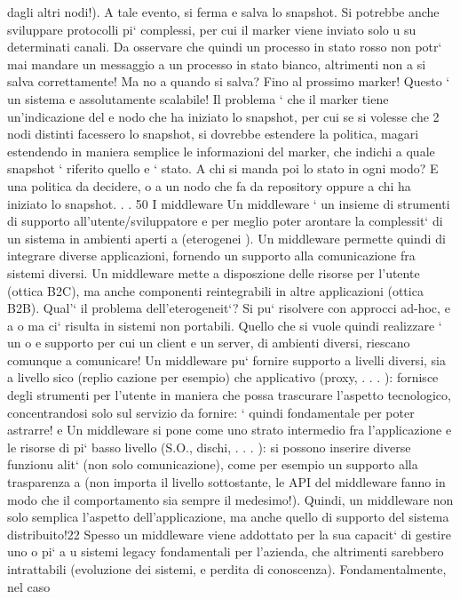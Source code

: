 \documentclass[a4paper,12pt]{article}
\begin{document}
dagli altri nodi!). A tale evento, si ferma e salva lo snapshot. Si potrebbe
anche sviluppare protocolli pi` complessi, per cui il marker viene inviato solo
u
su determinati canali. Da osservare che quindi un processo in stato rosso non
potr` mai mandare un messaggio a un processo in stato bianco, altrimenti non
a
si salva correttamente!
Ma no a quando si salva? Fino al prossimo marker! Questo ` un sistema
e
assolutamente scalabile! Il problema ` che il marker tiene un'indicazione del
e
nodo che ha iniziato lo snapshot, per cui se si volesse che 2 nodi distinti facessero
lo snapshot, si dovrebbe estendere la politica, magari estendendo in maniera
semplice le informazioni del marker, che indichi a quale snapshot ` riferito quello
e
`
stato. A chi si manda poi lo stato in ogni modo? E una politica da decidere, o
a un nodo che fa da repository oppure a chi ha iniziato lo snapshot. . .
50
I middleware
Un middleware ` un insieme di strumenti di supporto all'utente/sviluppatore
e
per meglio poter arontare la complessit` di un sistema in ambienti aperti
a
(eterogenei ). Un middleware permette quindi di integrare diverse applicazioni,
fornendo un supporto alla comunicazione fra sistemi diversi.
Un middleware mette a disposzione delle risorse per l'utente (ottica B2C),
ma anche componenti reintegrabili in altre applicazioni (ottica B2B).
Qual'` il problema dell'eterogeneit`? Si pu` risolvere con approcci ad-hoc,
e
a
o
ma ci` risulta in sistemi non portabili. Quello che si vuole quindi realizzare ` un
o
e
supporto per cui un client e un server, di ambienti diversi, riescano comunque
a comunicare!
Un middleware pu` fornire supporto a livelli diversi, sia a livello sico (replio
cazione per esempio) che applicativo (proxy, . . . ): fornisce degli strumenti per
l'utente in maniera che possa trascurare l'aspetto tecnologico, concentrandosi
solo sul servizio da fornire: ` quindi fondamentale per poter astrarre!
e
Un middleware si pone come uno strato intermedio fra l'applicazione e le
risorse di pi` basso livello (S.O., dischi, . . . ): si possono inserire diverse funzionu
alit` (non solo comunicazione), come per esempio un supporto alla trasparenza
a
(non importa il livello sottostante, le API del middleware fanno in modo che
il comportamento sia sempre il medesimo!). Quindi, un middleware non solo
semplica l'aspetto dell'applicazione, ma anche quello di supporto del sistema
distribuito!22
Spesso un middleware viene addottato per la sua capacit` di gestire uno o pi`
a
u
sistemi legacy fondamentali per l'azienda, che altrimenti sarebbero intrattabili
(evoluzione dei sistemi, e perdita di conoscenza). Fondamentalmente, nel caso
\end{document}
